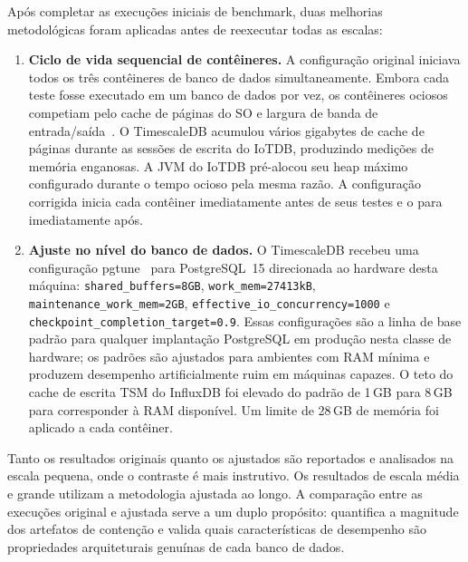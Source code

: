 Após completar as execuções iniciais de benchmark, duas melhorias metodológicas foram aplicadas
antes de reexecutar todas as escalas:

\begin{enumerate}
  \item \textbf{Ciclo de vida sequencial de contêineres.} A configuração original iniciava todos
    os três contêineres de banco de dados simultaneamente. Embora cada teste fosse executado em
    um banco de dados por vez, os contêineres ociosos competiam pelo cache de páginas do SO e
    largura de banda de entrada/saída~\citep{shapira2016pitfalls}. O TimescaleDB acumulou vários gigabytes de cache de páginas durante
    as sessões de escrita do IoTDB, produzindo medições de memória enganosas. A JVM
    do IoTDB pré-alocou seu heap máximo configurado durante o tempo ocioso pela mesma razão.
    A configuração corrigida inicia cada contêiner imediatamente antes de seus testes e o para
    imediatamente após.

  \item \textbf{Ajuste no nível do banco de dados.} O TimescaleDB recebeu uma configuração
    pgtune~\citep{pgtune} para PostgreSQL~15 direcionada ao hardware desta máquina:
    \texttt{shared\_buffers=8GB}, \texttt{work\_mem=27413kB},
    \texttt{maintenance\_work\_mem=2GB}, \texttt{effective\_io\_concurrency=1000} e
    \texttt{checkpoint\_completion\_target=0.9}. Essas configurações são a linha de base padrão
    para qualquer implantação PostgreSQL em produção nesta classe de hardware; os padrões são
    ajustados para ambientes com RAM mínima e produzem desempenho artificialmente ruim em
    máquinas capazes. O teto do cache de escrita TSM do InfluxDB foi elevado do padrão de 1\,GB
    para 8\,GB para corresponder à RAM disponível. Um limite de 28\,GB de memória foi aplicado a
    cada contêiner.
\end{enumerate}

Tanto os resultados originais quanto os ajustados são reportados e analisados na escala pequena,
onde o contraste é mais instrutivo. Os resultados de escala média e grande utilizam a metodologia
ajustada ao longo. A comparação entre as execuções original e ajustada serve a um duplo
propósito: quantifica a magnitude dos artefatos de contenção e valida quais características de
desempenho são propriedades arquiteturais genuínas de cada banco de dados.
